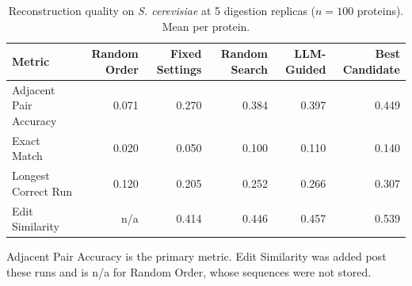 \begin{table}[!tb]
  \centering
  \caption{Reconstruction quality on \textnormal{\textnormal{\textit{S. cerevisiae}}} at 5 digestion replicas ($n=100$ proteins). Mean per protein.}
  \label{tab:main_results_yeast_r5}
  \begin{tabular}{lrrrrr}
    \toprule
    Metric & Random Order & Fixed Settings & Random Search & LLM-Guided & Best Candidate \\
    \midrule
    Adjacent Pair Accuracy & 0.071 & 0.270 & 0.384 & 0.397 & 0.449 \\
    Exact Match & 0.020 & 0.050 & 0.100 & 0.110 & 0.140 \\
    Longest Correct Run & 0.120 & 0.205 & 0.252 & 0.266 & 0.307 \\
    Edit Similarity & n/a & 0.414 & 0.446 & 0.457 & 0.539 \\
    \bottomrule
  \end{tabular}
  \par\smallskip\footnotesize{Adjacent Pair Accuracy is the primary metric. Edit Similarity was added post these runs and is n/a for Random Order, whose sequences were not stored.}
\end{table}
